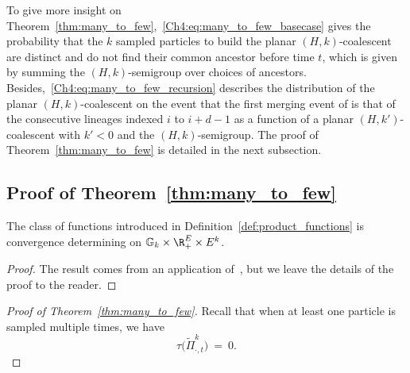 \begin{refsegment}
To give more insight on Theorem~\ref{thm:many_to_few},~\eqref{Ch4:eq:many_to_few_basecase} gives the probability that the $k$  sampled particles to build the planar $(H,k)$-coalescent are distinct and do not find their common ancestor before time $t$, which is given by summing the $(H,k)$-semigroup over choices of ancestors. Besides,~\eqref{Ch4:eq:many_to_few_recursion} describes the distribution of the planar $(H,k)$-coalescent on the event that the first merging event of is that of the consecutive lineages indexed $i$ to $i+d-1$ as a function of a planar $(H,k')$-coalescent with $k'<0$ and the $(H,k)$-semigroup. The proof of Theorem~\ref{thm:many_to_few} is detailed in the next subsection.



\subsection{Proof of Theorem~\ref{thm:many_to_few}}
\begin{lem}\label{lem:class_determining}
  The class of functions introduced in Definition~\ref{def:product_functions} is convergence determining on $\mathbb{G}_k \times \R_+^E\times E^k$.
\end{lem}
\begin{proof}
The result comes from an application of~\citet[Theorem 2.4]{billingsley}, but 
we leave the details of the proof to the reader.
\end{proof}

\begin{proof}[Proof of Theorem~\ref{thm:many_to_few}]

Recall that when at least one particle is sampled multiple times, we have
\[ 
\tau\big(\tilde{\Pi}^k_{\cdot,t}\big)\ =\ 0.
\] 


\end{proof}
\end{refsegment}
